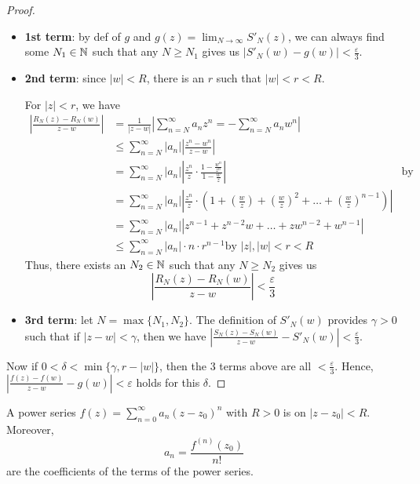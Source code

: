 \documentclass[12pt]{article}
\begin{document}
\begin{proof}
    \begin{itemize}
        \item \textbf{1st term}: by def of $g$ and $g(z)=\lim_{N\to \infty}S'_N(z)$, we can always find some $N_1\in \mathbb{N}$ such that any $N\geq N_1$ gives us $\left| S'_N(w)-g(w)\right| <\frac{\varepsilon}{3} $.
        \item \textbf{2nd term}: since $|w|<R$, there is an $r$ such that $|w|<r<R$.
        
        For $|z|<r$, we have \begin{align*}
            \left| \frac{R_N(z)-R_N(w)}{z-w}
            \right| &= \frac{1}{|z-w|}\left|\sum_{n=N}^{\infty}a_nz^n= - \sum_{n=N}^{\infty} a_nw^n\right|\\
            &\leq \sum_{n=N}^{\infty} |a_n| \left|\frac{z^n-w^n}{z-w}\right|\\
            &= \sum_{n=N}^{\infty} |a_n| \left|\frac{z^n}{z}\cdot \frac{1-\frac{w^n}{z^n}}{1-\frac{w}{z}}\right| & \text{by geometric sequence}\\
            &= \sum_{n=N}^{\infty} |a_n| \left|\frac{z^n}{z}\cdot \left(
                1+\left(\frac{w}{z}\right) + \left(\frac{w}{z}\right)^2 + \dots + \left(\frac{w}{z}\right)^{n-1}
            \right)\right|\\
            &= \sum_{n=N}^{\infty} |a_n| \left|
                z^{n-1}+z^{n-2}w+\dots + zw^{n-2}+w^{n-1}
            \right|\\
            &\leq \sum_{n=N}^{\infty} |a_n|\cdot n\cdot r^{n-1} \text{by }|z|,|w|<r<R
        \end{align*}
        Thus, there exists an $N_2\in \mathbb{N}$ such that any $N\geq N_2$ gives us $$\left| \frac{R_N(z)-R_N(w)}{z-w}
        \right|<\frac{\varepsilon}{3}$$
        \item \textbf{3rd term}: let $N=\max\{N_1,N_2\}$. The definition of $S'_N(w)$ provides $\gamma>0$ such that if $|z-w|<\gamma$, then we have $\left| \frac{S_N(z)-S_N(w)}{z-w} - S'_N(w)
        \right|<\frac{\varepsilon}{3}$.
    \end{itemize}

    Now if $0<\delta<\min\{\gamma, r-|w|\}$, then the 3 terms above are all $<\frac{\varepsilon}{3}$. Hence, $\left|\frac{f(z)-f(w)}{z-w}-g(w)\right|<\varepsilon$ holds for this $\delta$.
\end{proof}

\begin{corollary}
    A power series $f(z)=\sum_{n=0}^{\infty}a_n(z-z_0)^n$ with $R>0$ is  on $|z-z_0|<R$. Moreover, \[a_n = \frac{f^{(n)}(z_0)}{n!}\] are the coefficients of the terms of the power series. 
\end{corollary}
\end{document}
